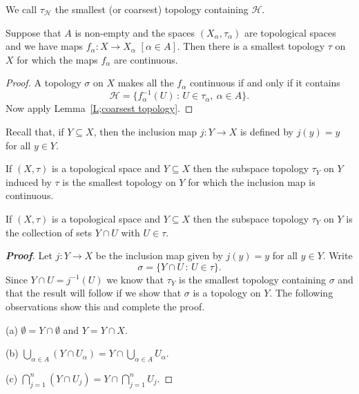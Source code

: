 We call $\tau_{\mathcal H}$ the smallest (or coarsest)  topology
containing ${\mathcal H}$.

\begin{lemma} Suppose that $A$ is non-empty and the
spaces $(X_{\alpha},\tau_{\alpha})$
are topological spaces and we have maps
$f_{\alpha}:X\rightarrow X_{\alpha}$ $[\alpha\in A]$.
Then there is a smallest topology $\tau$ on $X$ for which
the maps $f_{\alpha}$ are continuous.
\end{lemma}

\begin{proof} A topology $\sigma$ on $X$ makes all the $f_{\alpha}$
continuous if and only if it contains
\[{\mathcal H}=\{f_{\alpha}^{-1}(U)\,:\,
U\in\tau_{\alpha},\ \alpha\in A\}.\]
Now apply Lemma~\ref{L;coarsest topology}.
\end{proof}

Recall that, if $Y\subseteq X$, then the inclusion map $j:Y\rightarrow X$
is defined by $j(y)=y$ for all $y\in Y$.

\begin{definition}\label{D;subspace topology}
If $(X,\tau)$ is a topological space
and $Y\subseteq X$ then the subspace topology $\tau_{Y}$ on $Y$
induced by $\tau$ is the smallest topology on $Y$ for which the
inclusion map is continuous.
\end{definition}


\begin{lemma}\label{L;subspace topology}
If $(X,\tau)$ is a topological space
and $Y\subseteq X$ then the subspace topology $\tau_{Y}$ on $Y$
is the collection of sets $Y\cap U$ with $U\in\tau$.
\end{lemma}
\begin{proof}[\bf Proof] Let $j:Y\rightarrow X$ be the inclusion
map given by $j(y)=y$ for all $y\in Y$.
Write
\[\sigma=\{Y\cap U\,:\,U\in\tau\}.\]
Since $Y\cap U=j^{-1}(U)$ we know that $\tau_{Y}$
is the smallest topology containing $\sigma$
and that the result will follow if we show that $\sigma$ is a topology
on $Y$. The following observations show this and complete
the proof.

(a) ${\emptyset}=Y\cap{\emptyset}$ and $Y=Y\cap X$.

(b) $\bigcup_{\alpha\in A}(Y\cap U_{\alpha})
=Y\cap\bigcup_{\alpha\in A}U_{\alpha}$.

(c) $\bigcap_{j=1}^{n}(Y\cap U_{j})=Y\cap\bigcap_{j=1}^{n}U_{j}$.
\end{proof}



